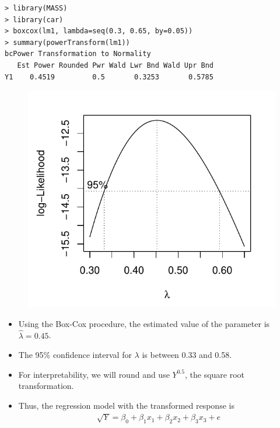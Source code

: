 \documentclass[10pt]{beamer}\usepackage[]{graphicx}\usepackage[]{color}
\begin{document}
\begin{frame}[fragile]
\small
\begin{verbatim}
> library(MASS)
> library(car)
> boxcox(lm1, lambda=seq(0.3, 0.65, by=0.05))
> summary(powerTransform(lm1))
bcPower Transformation to Normality 
   Est Power Rounded Pwr Wald Lwr Bnd Wald Upr Bnd
Y1    0.4519         0.5       0.3253       0.5785
\end{verbatim}
\begin{figure}
\includegraphics[scale=0.55]{figure/defects_boxcox.pdf}
\end{figure}
\end{frame}

\begin{frame}
\begin{itemize}
\item Using the Box-Cox procedure, the estimated value of the parameter is $\hat{\lambda} = 0.45$.
\vspace{5pt}
\item The 95\% confidence interval for $\lambda$ is between 0.33 and 0.58.  
\vspace{5pt}
\item For interpretability, we will round and use $Y^{0.5}$, the square root transformation.
\vspace{5pt}
\item Thus, the regression model with the transformed response is
\begin{align*}
\sqrt{Y} = \beta_0 + \beta_1 x_1 + \beta_2 x_2 + \beta_3 x_3 + e
\end{align*}
\end{itemize}
\end{frame}
\end{document}

